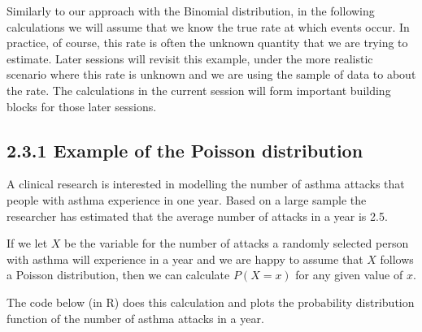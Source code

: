 \documentclass[letterpaper,10pt,english]{jupyterBook}
\begin{document}
\sphinxAtStartPar
Similarly to our approach with the Binomial distribution, in the following calculations we will assume that we know the true rate at which events occur. In practice, of course, this rate is often the unknown quantity that we are trying to estimate. Later sessions will revisit this example, under the more realistic scenario where this rate is unknown and we are using the sample of data to  about the rate. The calculations in the current session will form important building blocks for those later sessions.


\subsection{2.3.1 Example of the Poisson distribution}
\label{\detokenize{02.d. Probability.Discrete:example-of-the-poisson-distribution}}
\sphinxAtStartPar
A clinical research is interested in modelling the number of asthma attacks that people with asthma experience in one year. Based on a large sample the researcher has estimated that the average number of attacks in a year is 2.5.

\sphinxAtStartPar
If we let \(X\) be the variable for the number of attacks a randomly selected person with asthma will experience in a year and we are happy to assume that \(X\) follows a Poisson distribution, then we can calculate \(P(X=x)\) for any given value of \(x\).

\sphinxAtStartPar
The code below (in R) does this calculation and plots the probability distribution function of the number of asthma attacks in a year.

\begin{sphinxVerbatim}[commandchars=\\\{\}]
  
  
   

 
 
\end{sphinxVerbatim}
\end{document}
